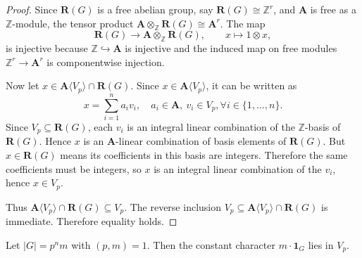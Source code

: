 \begin{proof}
Since \(\mathbf{R}(G)\) is a free abelian group, say \(\mathbf{R}(G) \cong \mathbb{Z}^r\), and \(\mathbf{A}\) is free as a \(\mathbb{Z}\)-module, the tensor product \(\mathbf{A} \otimes_{\mathbb{Z}} \mathbf{R}(G) \cong \mathbf{A}^r\). The map
\[
\mathbf{R}(G) \to \mathbf{A} \otimes_{\mathbb{Z}} \mathbf{R}(G), \qquad x \mapsto 1 \otimes x,
\]
is injective because \(\mathbb{Z} \hookrightarrow \mathbf{A}\) is injective and the induced map on free modules \(\mathbb{Z}^r \to \mathbf{A}^r\) is componentwise injection.

Now let \(x \in \mathbf{A}\langle V_p \rangle \cap \mathbf{R}(G)\). Since \(x \in \mathbf{A}\langle V_p \rangle\), it can be written as
\[
x = \sum_{i=1}^n a_i v_i, \quad a_i \in \mathbf{A},\ v_i \in V_p,\forall i\in \{1,\dots,n\}.
\]
Since \(V_p \subseteq \mathbf{R}(G)\), each \(v_i\) is an integral linear combination of the \(\mathbb{Z}\)-basis of \(\mathbf{R}(G)\). Hence \(x\) is an \(\mathbf{A}\)-linear combination of basis elements of \(\mathbf{R}(G)\). But \(x \in \mathbf{R}(G)\) means its coefficients in this basis are integers. Therefore the same coefficients must be integers, so \(x\) is an integral linear combination of the \(v_i\), hence \(x \in V_p\).

Thus \(\mathbf{A}\langle V_p \rangle \cap \mathbf{R}(G) \subseteq V_p\). The reverse inclusion \(V_p \subseteq \mathbf{A}\langle V_p \rangle \cap \mathbf{R}(G)\) is immediate. Therefore equality holds.
\end{proof}
\begin{thm}
\label{m in V_p}
Let \(|G| = p^n m\) with \((p,m) = 1\). Then the constant character \(m \cdot\mathbf1_G\) lies in \(V_p\).
\end{thm}

